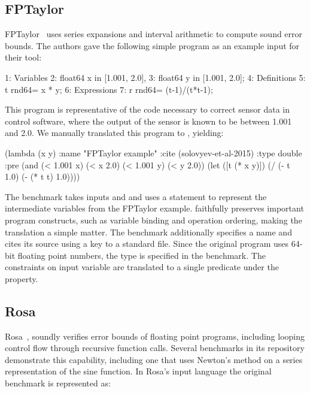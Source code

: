 \documentclass[main.tex]{subfiles}
\begin{document}
\subsection{FPTaylor}


FPTaylor~\cite{fptaylor-fm15} uses series expansions and interval
arithmetic to compute sound error bounds. The authors gave the following
simple program as an example input for their tool:

\begin{code}
1: Variables
2:   float64 x in [1.001, 2.0],
3:   float64 y in [1.001, 2.0];
4: Definitions
5:   t rnd64= x * y;
6: Expressions
7:   r rnd64= (t-1)/(t*t-1);
\end{code}

This program is representative of the code necessary to correct sensor data
in control software, where the output of the sensor is known to be between
1.001 and 2.0. We manually translated this program to \core, yielding:

\begin{code}
(lambda (x y)
  :name "FPTaylor example"
  :cite (solovyev-et-al-2015)
  :type double
  :pre (and (< 1.001 x) (< x 2.0) (< 1.001 y) (< y 2.0))
  (let ([t (* x y)])
    (/ (- t 1.0)  (- (* t t) 1.0))))
\end{code}

The benchmark takes inputs  and 
  and uses a  statement to represent the intermediate variables
  from the FPTaylor example.
\core faithfully preserves important program constructs,
  such as variable binding and operation ordering,
  making the translation a simple matter.
The benchmark additionally specifies a name
  and cites its source using a key to a standard \BibTeX{} file.
Since the original program uses 64-bit floating point numbers,
  the type  is specified in the benchmark.
The constraints on input variable are translated to
  a single predicate under the  property.


\subsection{Rosa}

Rosa~\cite{DarulovaK14}, soundly verifies error bounds of floating point
programs, including looping control flow through recursive function calls.
Several benchmarks in its repository demonstrate this capability, including
one that uses Newton's method on a series representation of the sine
function.  In Rosa's input language the original benchmark is represented
as:
\end{document}
